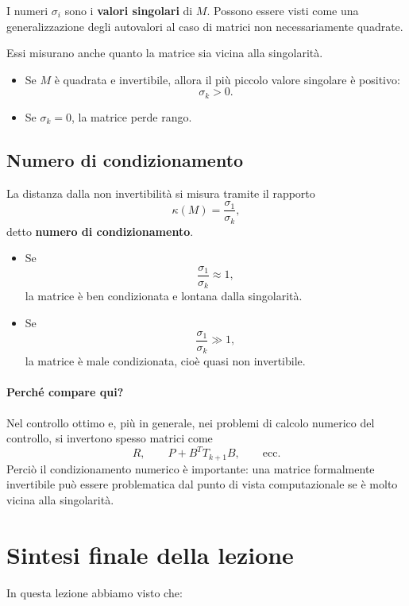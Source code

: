 I numeri \(\sigma_i\) sono i \textbf{valori singolari} di \(M\).
Possono essere visti come una generalizzazione degli autovalori al caso di matrici non necessariamente quadrate.

Essi misurano anche quanto la matrice sia vicina alla singolarità.

\begin{itemize}
    \item Se \(M\) è quadrata e invertibile, allora il più piccolo valore singolare è positivo:
    \[
    \sigma_k>0.
    \]
    \item Se \(\sigma_k=0\), la matrice perde rango.
\end{itemize}

\subsection{Numero di condizionamento}

La distanza dalla non invertibilità si misura tramite il rapporto
\[
\kappa(M)=\frac{\sigma_1}{\sigma_k},
\]
detto \textbf{numero di condizionamento}.

\begin{itemize}
    \item Se
    \[
    \frac{\sigma_1}{\sigma_k}\approx 1,
    \]
    la matrice è ben condizionata e lontana dalla singolarità.
    \item Se
    \[
    \frac{\sigma_1}{\sigma_k}\gg 1,
    \]
    la matrice è male condizionata, cioè quasi non invertibile.
\end{itemize}

\paragraph{Perché compare qui?}
Nel controllo ottimo e, più in generale, nei problemi di calcolo numerico del controllo, si invertono spesso matrici come
\[
R,\qquad P+B^TT_{k+1}B,\qquad \text{ecc.}
\]
Perciò il condizionamento numerico è importante: una matrice formalmente invertibile può essere problematica dal punto di vista computazionale se è molto vicina alla singolarità.

\section{Sintesi finale della lezione}

In questa lezione abbiamo visto che:

